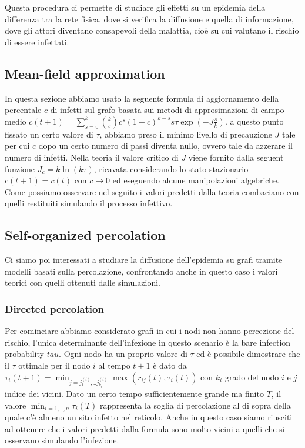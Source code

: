 Questa procedura ci permette di studiare gli effetti su un epidemia della differenza tra la rete fisica, dove si verifica la
diffusione e quella di informazione, dove gli attori diventano consapevoli della malattia,
cioè su cui valutano il rischio di essere infettati.

\subsection{Mean-field approximation}\label{subsec:mean-field-approximation}
In questa sezione abbiamo usato la seguente formula di aggiornamento della percentale $c$ di infetti sul grafo basata
sui metodi di approsimazioni di campo medio $c(t+1)=\sum_{s=0}^{k}\binom{k}{s}c^{s}(1-c)^{k-s}s\tau\exp(-J\frac{s}{k})$.
a questo punto fissato un certo valore di $\tau$, abbiamo preso il minimo livello di precauzione $J$ tale per cui $c$ dopo un 
certo numero di passi diventa nullo, ovvero tale da azzerare il numero di infetti. 
Nella teoria il valore critico di $J$ viene fornito dalla seguent funzione $J_{c}=k\ln(k\tau)$, ricavata 
considerando lo stato stazionario $c(t+1)=c(t)$ con $c\to0$ ed eseguendo alcune manipolazioni algebriche.
Come possiamo osservare nel seguito i valori predetti dalla teoria combaciano con quelli restituiti simulando 
il processo infettivo.
\subsection{Self-organized percolation}\label{subsec:self-organized-percolation}
Ci siamo poi interessati a studiare la diffusione dell'epidemia su grafi tramite modelli basati 
sulla percolazione, confrontando anche in questo caso i valori teorici con quelli ottenuti dalle simulazioni.

\subsubsection{Directed percolation}\label{subsubsec:directed-percolation}
Per cominciare abbiamo considerato grafi in cui i nodi non hanno percezione del rischio, l'unica determinante 
dell'infezione in questo scenario è la bare infection probability $tau$. Ogni nodo ha un proprio valore di $\tau$
ed è possibile dimostrare che il $\tau$ ottimale per il nodo $i$ al tempo $t+1$ è dato da $\tau_{i}(t+1) = \min_{j= j^{(i)}_{1},..j^{(i)}_{k_{i}}}\max(r_{ij}(t), \tau_{i}(t))$
con $k_{i}$ grado del nodo $i$ e $j$ indice dei vicini.
Dato un certo tempo sufficientemente grande ma finito $T$, il valore  $\min_{i=1,..,n}\tau_{i}(T)$ 
rappresenta la soglia di percolazione al di sopra della quale c'è almeno un sito infetto nel reticolo.
Anche in questo caso siamo riusciti ad ottenere che i valori predetti dalla formula sono molto vicini a 
quelli che si osservano simulando l'infezione.
